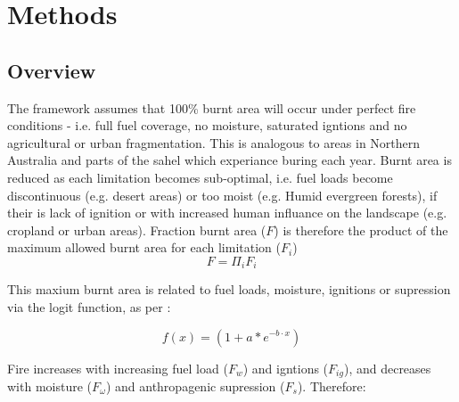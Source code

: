 \section{Methods}

\subsection{Overview}
The framework assumes that 100\% burnt area will occur under perfect fire conditions -  i.e. full fuel coverage, no moisture, saturated igntions and no agricultural or urban fragmentation. This is analogous to areas in Northern Australia and parts of the sahel which experiance buring each year.
Burnt area is reduced as each limitation becomes sub-optimal, i.e.
    fuel loads become discontinuous  (e.g. desert areas)
    or too moist (e.g. Humid evergreen forests),
    if their is lack of ignition %
    or with increased human influance on the landscape (e.g. cropland or urban areas).
Fraction burnt area ($F$) is therefore the product of the maximum allowed burnt area for each limitation ($F_i$)
\begin{equation}
    F=\Pi_{i} F_i
\end{equation}

This maxium burnt area is related to fuel loads, moisture, ignitions or supression via the logit function, as per \citet{bistinas2014causal}:

\begin{equation}
    f(x) = (1 + a * e^{-b \cdot x})
\end{equation}


Fire increases with increasing fuel load ($F_w$) and igntions ($F_{ig}$), and decreases with moisture ($F_{\omega}$) and anthropagenic supression ($F_s$). Therefore:


